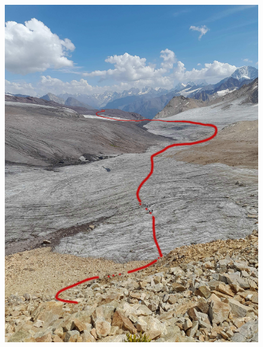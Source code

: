 \begin{figure}[h!]
	\centering
	\begin{minipage}[h]{0.4\linewidth}
		\includegraphics[width=0.99\linewidth]{../pics/20240830_141852.jpg}
	\end{minipage}
	\qquad
	\begin{minipage}[h]{0.4\linewidth}

\end{minipage}
\end{figure}
